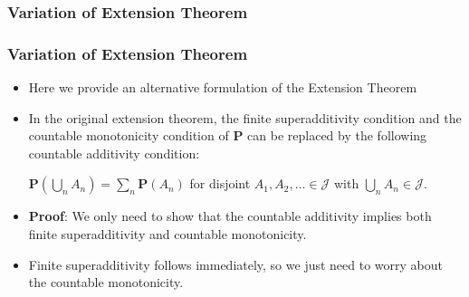\documentclass[handout]{beamer}
\newcommand{\BP}{\mathbf{P}}
\begin{document}
\subsubsection{Variation of Extension Theorem}
\frame
{
  \frametitle{Variation of Extension Theorem}

   \begin{itemize}

            \item<1-> Here we provide an alternative formulation of the Extension Theorem
            
         \item<2->[]    \begin{corollary}[2.5.4] In the original extension theorem, the finite superadditivity condition and the countable monotonicity condition of $\mathbf{P}$ can be replaced by the following countable additivity condition:
            
                    $\BP(\bigcup_{n} A_n)= \sum_{n} \BP(A_n)$ for disjoint $A_1,A_2,\ldots \in\mathcal{J}$ with $\bigcup_{n} A_n  \in\mathcal{J}$.
            
            \end{corollary}    
       
              \item<3-> []\textbf{Proof}: We only need to show that the countable additivity implies both finite superadditivity and countable monotonicity. 
              
              \item<4->[]  Finite superadditivity follows immediately, so we just need to worry about the countable monotonicity. 
                                      

                   \end{itemize}
}
\end{document}
